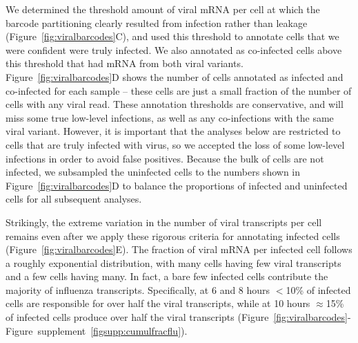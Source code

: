 \documentclass[9pt,lineno]{elife}
\begin{document}
We determined the threshold amount of viral mRNA per cell at which the barcode partitioning clearly resulted from infection rather than leakage (Figure~\ref{fig:viralbarcodes}C), and used this threshold to annotate cells that we were confident were truly infected.
We also annotated as co-infected cells above this threshold that had mRNA from both viral variants.
Figure~\ref{fig:viralbarcodes}D shows the number of cells annotated as infected and co-infected for each sample -- these cells are just a small fraction of the number of cells with any viral read.
These annotation thresholds are conservative, and will miss some true low-level infections, as well as any co-infections with the same viral variant.
However, it is important that the analyses below are restricted to cells that are truly infected with virus, so we accepted the loss of some low-level infections in order to avoid false positives.
Because the bulk of cells are not infected, we subsampled the uninfected cells to the numbers shown in Figure~\ref{fig:viralbarcodes}D to balance the proportions of infected and uninfected cells for all subsequent analyses.

Strikingly, the extreme variation in the number of viral transcripts per cell remains even after we apply these rigorous criteria for annotating infected cells (Figure~\ref{fig:viralbarcodes}E). 
The fraction of viral mRNA per infected cell follows a roughly exponential distribution, with many cells having few viral transcripts and a few cells having many.
In fact, a bare few infected cells contribute the majority of influenza transcripts.
Specifically, at 6 and 8 hours $<$10\% of infected cells are responsible for over half the viral transcripts, while at 10 hours $\approx$15\% of infected cells produce over half the viral transcripts (Figure~\ref{fig:viralbarcodes}-Figure~supplement~\ref{figsupp:cumulfracflu}).
\end{document}
